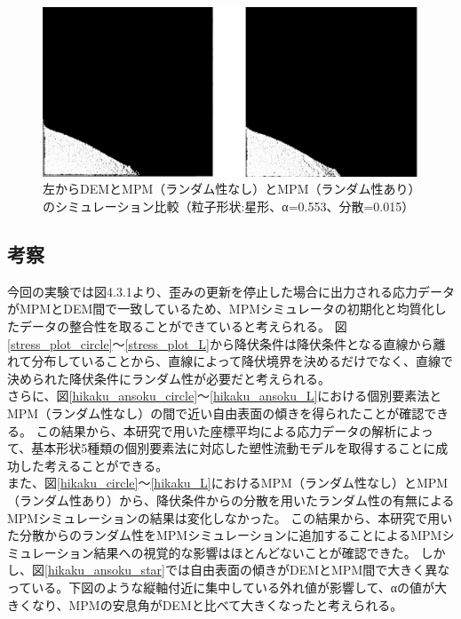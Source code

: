 \documentclass[12pt]{ltjsarticle}
\begin{document}
\begin{figure}[htbp]
  \centering
  \includegraphics*[keepaspectratio, scale=0.35]{star_hikaku.PNG}
  \caption{左からDEMとMPM（ランダム性なし）とMPM（ランダム性あり）のシミュレーション比較（粒子形状:星形、α=0.553、分散=0.015）}
  \label{hikaku_star}
\end{figure}



\subsection{考察}
今回の実験では図4.3.1より、歪みの更新を停止した場合に出力される応力データがMPMとDEM間で一致しているため、MPMシミュレータの初期化と均質化したデータの整合性を取ることができていると考えられる。
図\ref{stress_plot_circle}〜\ref{stress_plot_L}から降伏条件は降伏条件となる直線から離れて分布していることから、直線によって降伏境界を決めるだけでなく、直線で決められた降伏条件にランダム性が必要だと考えられる。\\
さらに、図\ref{hikaku_ansoku_circle}〜\ref{hikaku_ansoku_L}における個別要素法とMPM（ランダム性なし）の間で近い自由表面の傾きを得られたことが確認できる。
この結果から、本研究で用いた座標平均による応力データの解析によって、基本形状5種類の個別要素法に対応した塑性流動モデルを取得することに成功した考えることができる。\\
また、図\ref{hikaku_circle}〜\ref{hikaku_L}におけるMPM（ランダム性なし）とMPM（ランダム性あり）から、降伏条件からの分散を用いたランダム性の有無によるMPMシミュレーションの結果は変化しなかった。
この結果から、本研究で用いた分散からのランダム性をMPMシミュレーションに追加することによるMPMシミュレーション結果への視覚的な影響はほとんどないことが確認できた。
しかし、図\ref{hikaku_ansoku_star}では自由表面の傾きがDEMとMPM間で大きく異なっている。下図のような縦軸付近に集中している外れ値が影響して、αの値が大きくなり、MPMの安息角がDEMと比べて大きくなったと考えられる。
\end{document}
